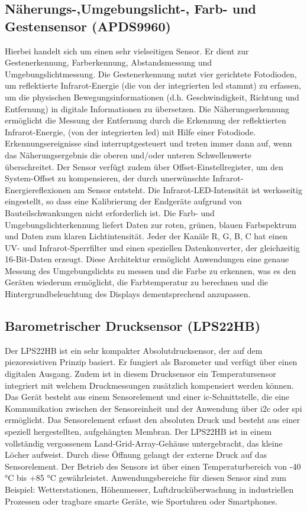 \subsection{Näherungs-,Umgebungslicht-, Farb- und Gestensensor (APDS9960)}
Hierbei handelt sich um einen sehr vielseitigen Sensor. Er dient zur Gestenerkennung, Farberkennung, Abstandsmessung und Umgebungslichtmessung. Die Gestenerkennung nutzt vier gerichtete Fotodioden, um reflektierte Infrarot-Energie (die von der integrierten \ac{led} stammt) zu erfassen, um die physischen Bewegungsinformationen (d.h. Geschwindigkeit, Richtung und Entfernung) in digitale Informationen zu übersetzen. Die Näherungserkennung ermöglicht die Messung der Entfernung durch die Erkennung der reflektierten Infrarot-Energie, (von der integrierten \ac{led}) mit Hilfe einer Fotodiode. Erkennungsereignisse sind interruptgesteuert und treten immer dann auf, wenn das Näherungsergebnis die oberen und/oder unteren Schwellenwerte überschreitet. Der Sensor verfügt zudem über Offset-Einstellregister, um den System-Offset zu kompensieren, der durch unerwünschte Infrarot-Energiereflexionen am Sensor entsteht. Die Infrarot-LED-Intensität ist werksseitig eingestellt, so dass eine Kalibrierung der Endgeräte aufgrund von Bauteilschwankungen nicht erforderlich ist. Die Farb- und Umgebungslichterkennung liefert Daten zur roten, grünen, blauen Farbspektrum und Daten zum klaren Lichtintensität. Jeder der Kanäle R, G, B, C hat einen UV- und Infrarot-Sperrfilter und einen speziellen Datenkonverter, der gleichzeitig 16-Bit-Daten erzeugt. Diese Architektur ermöglicht Anwendungen eine genaue Messung des Umgebungslichts zu messen und die Farbe zu erkennen, was es den Geräten wiederum ermöglicht, die Farbtemperatur zu berechnen und die Hintergrundbeleuchtung des Displays dementsprechend anzupassen.\cite{AT.2015}\cite{Ard.2024}
	
\subsection{Barometrischer Drucksensor (LPS22HB)}
Der LPS22HB ist ein sehr kompakter Absolutdrucksensor, der auf dem piezoresistiven Prinzip basiert. Er fungiert als Barometer und verfügt über einen digitalen Ausgang. Zudem ist in diesem Drucksensor ein Temperatursensor integriert mit welchem Druckmessungen zusätzlich kompensiert werden können. Das Gerät besteht aus einem Sensorelement und einer \ac{ic}-Schnittstelle, die eine Kommunikation zwischen der Sensoreinheit und der Anwendung über \ac{i2c} oder \ac{spi} ermöglicht. Das Sensorelement erfasst den absoluten Druck und besteht aus einer speziell hergestellten, aufgehängten Membran. Der LPS22HB ist in einem vollständig vergossenem Land-Grid-Array-Gehäuse untergebracht, das kleine Löcher aufweist. Durch diese Öffnung gelangt der externe Druck auf das Sensorelement. Der Betrieb des Sensors ist über einen Temperaturbereich von -40 °C bis +85 °C gewährleistet. \cite{STM2.2017}\cite{Ard.2024}
Anwendungsbereiche für diesen Sensor sind zum Beispiel: Wetterstationen, Höhenmesser, Luftdrucküberwachung in industriellen Prozessen oder tragbare smarte Geräte, wie Sportuhren oder Smartphones.
	
